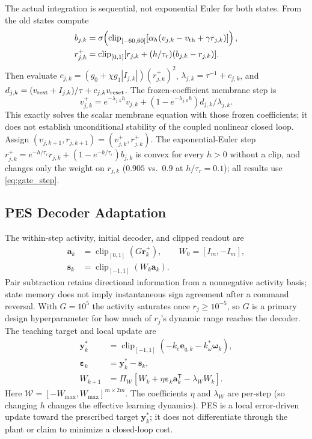 \documentclass[letterpaper, 10 pt, conference]{ieeeconf}
\newcommand{\T}{^{\mathsf T}}
\newcommand{\clip}{\operatorname{clip}}
\begin{document}
The actual integration is sequential, not exponential Euler for both
states. From the old states compute
\begin{align}
 b_{j,k}&=\sigma\!\left(\clip_{[-60,60]}
       [\alpha_h(v_{j,k}-v_{\rm th}+\gamma r_{j,k})]\right),\\
 r_{j,k}^{+}&=\clip_{[0,1]}
       [r_{j,k}+(h/\tau_r)(b_{j,k}-r_{j,k})].
 \label{eq:gate_step}
\end{align}
Then evaluate $c_{j,k}=(g_0+\chi g_1|I_{j,k}|)(r_{j,k}^{+})^2$,
$\lambda_{j,k}=\tau^{-1}+c_{j,k}$, and
$d_{j,k}=(v_{\rm rest}+I_{j,k})/\tau+c_{j,k}v_{\rm reset}$. The
frozen-coefficient membrane step is
\begin{equation}
 v_{j,k}^{+}=e^{-\lambda_{j,k}h}v_{j,k}
       +(1-e^{-\lambda_{j,k}h})d_{j,k}/\lambda_{j,k}.
 \label{eq:mem_step}
\end{equation}
This exactly solves the scalar membrane equation with those frozen
coefficients; it does not establish unconditional stability of the coupled
nonlinear closed loop. Assign $(v_{j,k+1},r_{j,k+1})=(v_{j,k}^{+},r_{j,k}^{+})$.
The exponential-Euler step $r_{j,k}^{+}=e^{-h/\tau_r}r_{j,k}+(1-e^{-h/\tau_r})b_{j,k}$ is
convex for every $h>0$ without a clip, and changes only the weight on $r_{j,k}$
($0.905$ vs.\ $0.9$ at $h/\tau_r=0.1$); all results use \eqref{eq:gate_step}.

\subsection{PES Decoder Adaptation}
The within-step activity, initial decoder, and clipped readout are
\begin{equation}
 \begin{aligned}
 \bm a_k&=\clip_{[0,1]}(G\bm r_k^+),\qquad W_0=[I_m,-I_m],\\
 \bm s_k&=\clip_{[-1,1]}(W_k\bm a_k).
 \end{aligned}
 \label{eq:readout}
\end{equation}
Pair subtraction retains directional information from a nonnegative
activity basis; state memory does not imply instantaneous sign agreement
after a command reversal. With $G=10^5$ the activity saturates once
$r_j\ge10^{-5}$, so $G$ is a primary design hyperparameter for how much of
$r_j$'s dynamic range reaches the decoder. The teaching target and local update are
\begin{align}
 \bm y_k^*&=\clip_{[-1,1]}(-k_e\bm e_{q,k}-k_\omega^*\bm\omega_k),\\
 \bm\varepsilon_k&=\bm y_k^*-\bm s_k,\\
 W_{k+1}&=\Pi_{\mathcal W}
       [W_k+\eta\bm\varepsilon_k\bm a_k\T-\lambda_W W_k].
 \label{eq:pes}
\end{align}
Here $\mathcal W=[-W_{\max},W_{\max}]^{m\times2m}$. The coefficients $\eta$ and $\lambda_W$ are per-step (so changing $h$ changes the effective learning dynamics). PES is a local error-driven update toward the prescribed target $\bm y_k^*$; it does not differentiate through the plant or claim to minimize a closed-loop cost.
\end{document}
